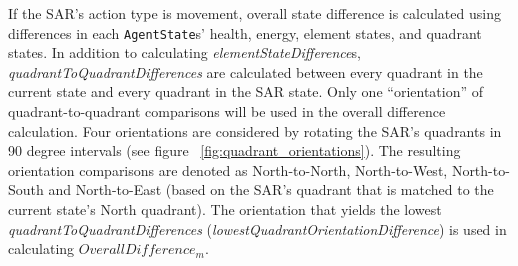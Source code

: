 

If the SAR's action type is movement, overall state difference is calculated using differences in each \texttt{AgentState}s' health, energy, element states, and quadrant states.
In addition to calculating \textit{elementStateDifference}s, \textit{quadrantToQuadrantDifferences} are calculated between every quadrant in the current state and every quadrant in the SAR state.
Only one ``orientation'' of quadrant-to-quadrant comparisons will be used in the overall difference calculation.
Four orientations are considered by rotating the SAR's quadrants in 90 degree intervals (see figure ~\ref{fig:quadrant_orientations}).
The resulting orientation comparisons are denoted as North-to-North, North-to-West, North-to-South and North-to-East (based on the SAR's quadrant that is matched to the current state's North quadrant).
The orientation that yields the lowest \textit{quadrantToQuadrantDifferences} (\textit{lowestQuadrantOrientationDifference}) is used in calculating $OverallDifference_{m}$.

